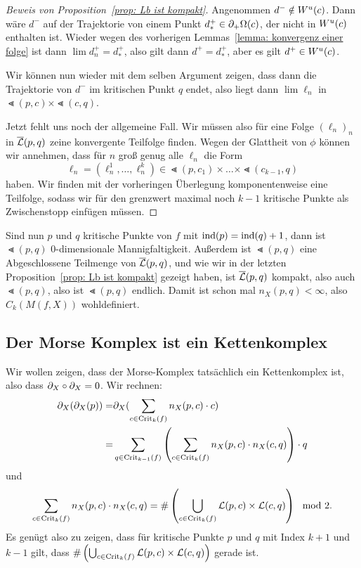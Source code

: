 \begin{proof}[Beweis von Proposition~\ref{prop: Lb ist kompakt}]
    Angenommen $d^- \notin { W^u } (c)$. Dann wäre $d^-$ auf der Trajektorie von einem Punkt
    $d^+_{\ast} \in { \partial }_+ \Omega (c)$, der nicht in ${ W^u } (c)$ enthalten ist. Wieder wegen des 
    vorherigen Lemmas~\ref{lemma: konvergenz einer folge} ist dann $\lim d_n^+ = d^+_{\ast}$, also 
    gilt dann $d^+ = d^+_{\ast}$, aber es gilt $d^+ \in { W^u } (c)$.
    
    Wir können nun wieder mit dem selben Argument zeigen, dass dann die Trajektorie von $d^-$ im
    kritischen Punkt $q$ endet, also liegt dann $\lim \ell_n$ in $\Lt (p, c) \times \Lt (c, q)$.

    Jetzt fehlt uns noch der allgemeine Fall. Wir müssen also für eine Folge $(\ell_n)_n$ in 
    ${\overline{\mathcal{L}} } (p, q)$ zeine konvergente Teilfolge finden. Wegen der Glattheit von $\phi$ können wir annehmen,
    dass für $n$ groß genug alle $\ell_n$ die Form 
    \[ \ell_n = (\ell^1_n, \dots, \ell^k_n) \in \Lt (p, c_1) \times \dots \times \Lt (c_{k - 1}, q) \]
    haben. Wir finden mit der vorheringen Überlegung komponentenweise eine Teilfolge, sodass wir 
    für den grenzwert maximal noch $k - 1$ kritische Punkte als \glqq Zwischenstopp\grqq{} einfügen
    müssen. 
\end{proof}

\begin{remark}
    Sind nun $p$ und $q$ kritische Punkte von $f$ mit ${ \operatorname{ind} } (p) = { \operatorname{ind} } (q) + 1$, dann ist 
    $\Lt(p, q)$ $0$-dimensionale Mannigfaltigkeit. Außerdem ist $\Lt (p, q)$ eine Abgeschlossene
    Teilmenge von ${\overline{\mathcal{L}} } (p, q)$, und wie wir in der letzten Proposition~\ref{prop: Lb ist kompakt}
    gezeigt haben, ist ${\overline{\mathcal{L}} }(p, q)$ kompakt, also auch $\Lt(p, q)$, also ist $\Lt (p, q)$ endlich.
    Damit ist schon mal $n_X (p, q)< \infty$, also $C_k(M (f, X))$ wohldefiniert.
\end{remark}

\subsection*{Der Morse Komplex ist ein Kettenkomplex}

Wir wollen zeigen, dass der Morse-Komplex tatsächlich ein Kettenkomplex ist, also dass 
${ \partial }_X \circ { \partial }_X = 0$.
Wir rechnen:
\begin{align*}
    { \partial }_X ({ \partial }_X (p)) = & { \partial }_X (\sum_{c \in { \operatorname{Crit} }_k (f)} n_X (p, c) \cdot c) \\
    = & \sum_{q \in { \operatorname{Crit} }_{k - 1}(f)} \left( 
        \sum_{c \in { \operatorname{Crit} }_k (f)} n_X(p, c) \cdot n_X(c, q) \right) \cdot q
\end{align*}
und 
\[ \sum_{c \in { \operatorname{Crit} }_k (f)} n_X(p, c) \cdot n_X(c, q) = 
\# \left( \bigcup_{c \in { \operatorname{Crit} }_k (f)} { \mathcal{L} } (p, c) \times { \mathcal{L} } (c, q) \right) \mod 2 . \]
Es genügt also zu zeigen, dass für kritische Punkte $p$ und $q$ mit Index $k + 1$ und $k - 1$
gilt, dass $\# \left( \bigcup_{c \in { \operatorname{Crit} }_k (f)} { \mathcal{L} } (p, c) \times { \mathcal{L} } (c, q) \right)$ gerade ist.

